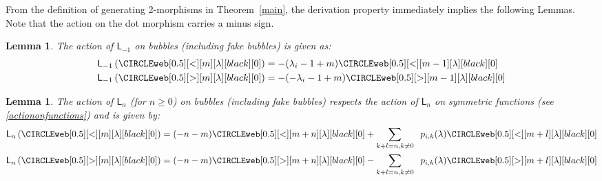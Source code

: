 \documentclass{amsart}
\numberwithin{equation}{section}
\newtheorem{lemma}[thm]{Lemma}
\theoremstyle{definition}
\newcommand{\LLn}[1][n]{{\mathsf{L}_{#1}}}
\begin{document}
From the definition of generating 2-morphisms in Theorem~\ref{main}, the derivation property immediately implies the following Lemmas. Note that the action on the dot morphism carries a minus sign.  

\begin{lemma}\label{actiononbubbles-1}
    The action of $\LLn[-1]$ on bubbles (including fake bubbles) is given as:  
\begin{align*}
    \LLn[-1]\left( \CIRCLEweb[0.5][<][m][\lambda][black][0] \right) &= - (\lambda_i - 1 + m)\CIRCLEweb[0.5][<][m-1][\lambda][black][0] \\
     \LLn[-1]\left( \CIRCLEweb[0.5][>][m][\lambda][black][0] \right) &= - (-\lambda_i - 1 + m)\CIRCLEweb[0.5][>][m-1][\lambda][black][0]
\end{align*}
\end{lemma}

\begin{lemma}\label{actiononbubbles}
    The action of $\LLn[n]$ (for $n \geq 0$) on bubbles (including fake bubbles) respects the action of $\LLn[n]$ on symmetric functions (see \ref{actiononfunctions}) and is given by:
\begin{align*}
    \LLn[n]\left( \CIRCLEweb[0.5][<][m][\lambda][black][0] \right) &= (-n- m) \CIRCLEweb[0.5][<][m+n][\lambda][black][0] + \sum_{k + l = n, k \neq 0} \;\; p_{i,k}(\lambda) \CIRCLEweb[0.5][<][m + l][\lambda][black][0] \\
     \LLn[n]\left( \CIRCLEweb[0.5][>][m][\lambda][black][0] \right) &= (-n- m) \CIRCLEweb[0.5][>][m+n][\lambda][black][0] - \sum_{k + l = n, k \neq 0} \;\; p_{i,k}(\lambda) \CIRCLEweb[0.5][>][m + l][\lambda][black][0]
\end{align*}
\end{lemma}
 
\end{document}
